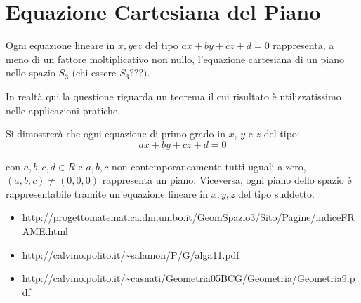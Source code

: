 \section{Equazione Cartesiana del Piano}
\begin{definizione}
Ogni equazione lineare in $x,y e z$ del tipo $ax+by+cz+d=0$ rappresenta, a meno di un fattore moltiplicativo non nullo,
l'equazione cartesiana di un piano nello spazio $S_3$ (chi essere $S_3$???).
\end{definizione}

\begin{osservazione}
In realtà qui la questione riguarda un teorema il cui risultato è utilizzatissimo nelle applicazioni pratiche.

Si dimostrerà che ogni equazione di primo grado in $x$, $y$ e $z$ del tipo:
\[
 ax+by+cz+d=0
\]

con $a,b,c,d \in R$ e $a,b,c$ non contemporaneamente tutti uguali a zero, $(a,b,c) \ne (0,0,0)$ rappresenta un piano. 
Viceversa, ogni piano dello spazio è rappresentabile tramite un'equazione lineare in $x,y,z$ del tipo suddetto.
\end{osservazione}

\begin{osservazione}
\begin{itemize}
 \item \url{http://progettomatematica.dm.unibo.it/GeomSpazio3/Sito/Pagine/indiceFRAME.html}
 \item \url{http://calvino.polito.it/~salamon/P/G/alga11.pdf}
 \item \url{http://calvino.polito.it/~casnati/Geometria05BCG/Geometria/Geometria9.pdf}
\end{itemize}
\end{osservazione}

